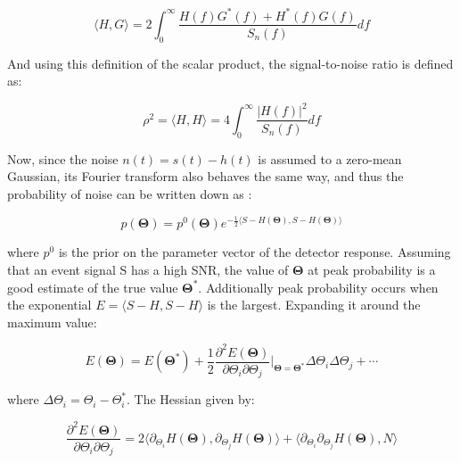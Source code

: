     \begin{equation}
        \langle H, G \rangle =
            2 \int_{0}^{\infty} \dfrac{H(f)G^{\ast}(f) + H^{\ast}(f)G(f)}{S_n(f)} df
    \end{equation}

    And using this definition of the scalar product, the signal-to-noise ratio is
    defined as:

    \begin{equation}
        \rho^2 =
            \langle H, H \rangle =
                4 \int_0^\infty \dfrac{|H(f)|^2}{S_n(f)} df
    \end{equation}

    Now, since the noise $n(t) = s(t) - h(t)$ is assumed to a zero-mean Gaussian, its
    Fourier transform also behaves the same way, and thus the probability of noise can
    be written down as :

    \begin{equation}
        \label{eq:probability}
        p(\mathbf{\Theta}) =
            p^0(\mathbf{\Theta})
            e^{
                -\frac{1}{2}
                \langle S - H(\mathbf{\Theta}), S - H(\mathbf{\Theta}) \rangle
            }
    \end{equation}

    where $p^0$ is the prior on the parameter vector of the detector response. Assuming
    that an event signal S has a high SNR, the value of $\mathbf{\Theta}$ at peak
    probability is a good estimate of the true value $\mathbf{\Theta}^{\ast}$.
    Additionally peak probability occurs when the exponential $E = \langle S - H, S - H
    \rangle$ is the largest. Expanding it around the maximum value:

    \begin{equation}
        E(\mathbf{\Theta}) =
            E(\mathbf{\Theta}^{\ast}) +
            \dfrac{1}{2}
            \dfrac{\partial^2 E(\mathbf{\Theta})}{\partial \Theta_i \partial \Theta_j}
            \bigg\rvert_{\mathbf{\Theta} =
                \mathbf{\Theta}^{\ast}}
                \Delta\Theta_i \Delta\Theta_j +
                \cdots
    \end{equation}

    where $\Delta \Theta_i = \Theta_i - \Theta_i^\ast$. The Hessian given by:

    \begin{equation}
        \dfrac{\partial^2 E(\mathbf{\Theta})}{\partial \Theta_i \partial \Theta_j} =
            2 \langle
                  \partial_{\Theta_i} H(\mathbf{\Theta}),
                  \partial_{\Theta_j} H(\mathbf{\Theta})
              \rangle +
              \langle
                  \partial_{\Theta_i} \partial_{\Theta_j} H(\mathbf{\Theta}),
                  N
              \rangle
    \end{equation}


